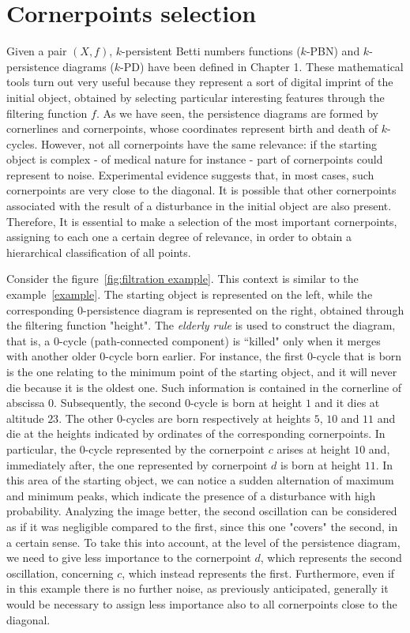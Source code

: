\documentclass[english, LaM, oneside, noexaminfo]{sapthesis}
\begin{document}
\section{Cornerpoints selection}
\label{Cornerpoint selection}

Given a pair $(X, f)$, $k$-persistent Betti numbers functions ($k$-PBN) and $k$-persistence diagrams
($k$-PD) have been defined in Chapter 1. These mathematical tools turn out very useful because they represent a sort of digital imprint of the initial object, obtained by selecting particular interesting features  through
the filtering function $f$.
As we have seen, the persistence diagrams are formed by cornerlines and cornerpoints,
whose coordinates represent birth and death of $k$-cycles.
However, not all cornerpoints have the same relevance: if the starting object is complex - of  medical nature for instance 
 - part of cornerpoints could represent to noise.
Experimental evidence suggests that, in most cases, such cornerpoints are very close to the diagonal. It is possible that  
other cornerpoints associated with the result of
a disturbance in the initial object are also present.
Therefore, It is essential to make a selection of the most important cornerpoints, assigning to each one a certain degree of relevance, in order to obtain a hierarchical classification of all points.

Consider the figure~\ref{fig:filtration example}.
This context is similar to the example~\ref{example}. The starting object is represented on the left, while the corresponding $0$-persistence diagram is represented on the right, obtained through the filtering function "height". The \textit{elderly rule} is used to construct the diagram, that is, a $0$-cycle (path-connected component) is “killed" only
when it merges with another older $0$-cycle born earlier. For instance, the first $0$-cycle that is born is the one relating to the minimum point of the starting object, and it will never die because it is the oldest one. Such information is contained in the cornerline of abscissa $0$. Subsequently, the second $0$-cycle is born at height $1$ and it dies at altitude $23$. The other $0$-cycles are born
respectively at heights $5$, $10$ and $11$ and die at the heights indicated by ordinates of the corresponding cornerpoints.
In particular, the $0$-cycle represented by the cornerpoint $c$ arises at height $10$ and, immediately after, the one represented by cornerpoint $d$ is born at height $11$.
In this area of the starting object, we can notice a sudden alternation of maximum and minimum peaks, which indicate the presence of a disturbance with high probability. Analyzing the image better, the second oscillation can be considered as if it was negligible compared to the first, since this one "covers" the second, in a certain sense.
To take this into account, at the level of the persistence diagram,
we need to give less importance to the cornerpoint $d$, which represents the second oscillation, concerning $c$, which instead represents the first.
Furthermore, even if in this example there is no further noise, as previously anticipated, generally it would be necessary to assign less importance also to all cornerpoints close to the diagonal.
\end{document}
